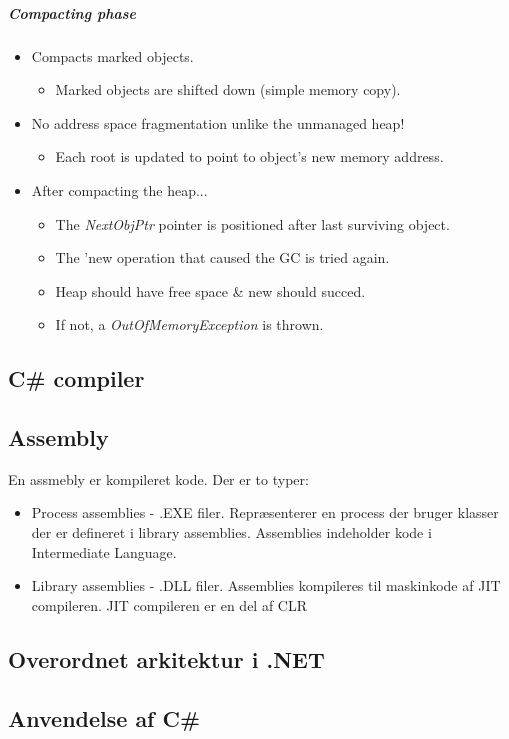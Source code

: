 \subparagraph{Compacting phase}
\begin{itemize}
	\item Compacts marked objects.
	\begin{itemize}
		\item Marked objects are shifted down (simple memory copy).		
	\end{itemize}
	\item No address space fragmentation unlike the unmanaged heap!
	\begin{itemize}
		\item Each root is updated to point to object's new memory address.
	\end{itemize}
	\item After compacting the heap...
	\begin{itemize}
		\item The \textit{NextObjPtr} pointer is positioned after last surviving object.
		\item The 'new operation that caused the GC is tried again.
		\item Heap should have free space \& new should succed.
	\end{itemize}
	\begin{itemize}
		\item If not, a \textit{OutOfMemoryException} is thrown.
	\end{itemize}
\end{itemize}

\subsection{C\# compiler}

\subsection{Assembly}
En assmebly er kompileret kode. Der er to typer:
\begin{itemize}
	\item Process assemblies - .EXE filer. Repræsenterer en process der bruger klasser der er defineret i library assemblies. Assemblies indeholder kode i Intermediate Language.
	\item Library assemblies - .DLL filer.
	Assemblies kompileres til maskinkode af JIT compileren. JIT compileren er en del af CLR
\end{itemize}

\subsection{Overordnet arkitektur i .NET}

\subsection{Anvendelse af C\#}